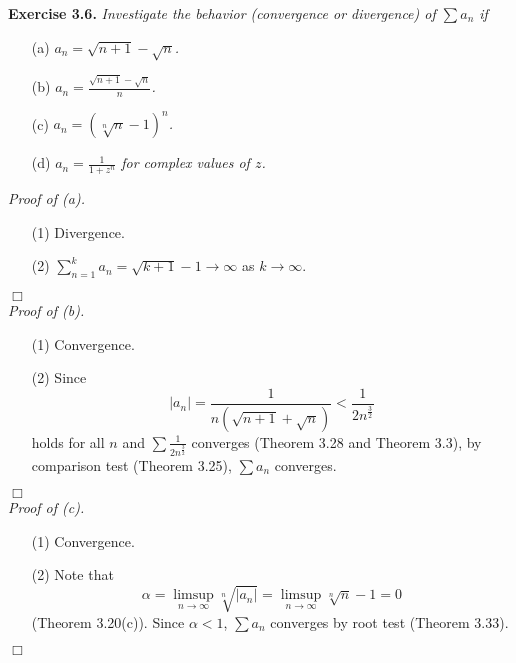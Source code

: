 \documentclass{article}
\begin{document}



\textbf{Exercise 3.6.}
\emph{Investigate the behavior (convergence or divergence) of $\sum a_n$ if}
\begin{enumerate}
\item[(a)]
\emph{$a_n = \sqrt{n+1} - \sqrt{n}$.}
\item[(b)]
\emph{$a_n = \frac{\sqrt{n+1} - \sqrt{n}}{n}$.}
\item[(c)]
\emph{$a_n = (\sqrt[n]{n} - 1)^n$.}
\item[(d)]
\emph{$a_n = \frac{1}{1+z^n}$ for complex values of $z$.} \\
\end{enumerate}

\emph{Proof of (a).}
\begin{enumerate}
\item[(1)]
Divergence.
\item[(2)]
$\sum_{n=1}^{k}a_n = \sqrt{k+1} - 1 \to \infty$ as $k \to \infty$.
\end{enumerate}
$\Box$ \\

\emph{Proof of (b).}
\begin{enumerate}
\item[(1)]
Convergence.
\item[(2)]
Since
$$|a_n|
= \frac{1}{n(\sqrt{n+1}+\sqrt{n})} < \frac{1}{2 n^{\frac{3}{2}}}$$
holds for all $n$ and $\sum \frac{1}{2 n^{\frac{3}{2}}}$ converges
(Theorem 3.28 and Theorem 3.3),
by comparison test (Theorem 3.25), $\sum a_n$ converges.
\end{enumerate}
$\Box$ \\

\emph{Proof of (c).}
\begin{enumerate}
\item[(1)]
Convergence.
\item[(2)]
Note that
$$\alpha
= \limsup_{n \to \infty} \sqrt[n]{|a_n|}
= \limsup_{n \to \infty} \sqrt[n]{n} - 1 = 0$$
(Theorem 3.20(c)).
Since $\alpha < 1$, $\sum a_n$ converges by root test (Theorem 3.33).
\end{enumerate}
$\Box$ \\
\end{document}

